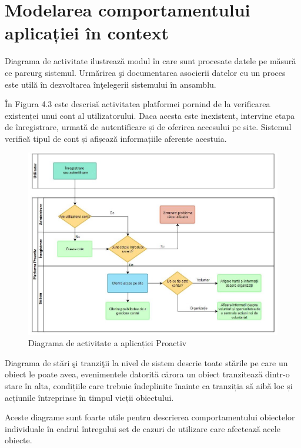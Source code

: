 \documentclass[12pt,a4paper]{report}
\begin{document}
\section{Modelarea comportamentului aplicației în context}
\par
Diagrama de activitate ilustrează modul în care sunt procesate datele pe măsură ce parcurg sistemul. Urmărirea şi documentarea asocierii datelor cu un proces este utilă în dezvoltarea înţelegerii sistemului în ansamblu. \cite{uml}
\\
\par
În Figura 4.3 este descrisă activitatea platformei pornind de la verificarea existenței unui cont al utilizatorului. Daca acesta este inexistent, intervine etapa de înregistrare, urmată de autentificare și de oferirea accesului pe site. Sistemul verifică tipul de cont și afișează informațiile aferente acestuia.
\\
\begin{figure}[h!]
\centering
  \includegraphics[width=1\linewidth]{./imagini/swimlane.JPG}
  \caption{Diagrama de activitate a aplicației Proactiv}
\end{figure}

\newpage
\par
Diagrama de stări şi tranziţii la nivel de sistem descrie toate stările pe care un obiect le poate avea, evenimentele datorită cărora un obiect tranzitează dintr-o stare în alta, condițiile care trebuie îndeplinite înainte ca tranziția să aibă loc și acțiunile întreprinse în timpul vieții obiectului.
\par
Aceste diagrame sunt foarte utile pentru descrierea comportamentului obiectelor individuale în cadrul întregului set de cazuri de utilizare care afectează acele obiecte.
\end{document}
